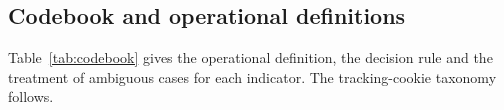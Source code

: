\documentclass[pdflatex,sn-basic,Numbered]{sn-jnl}
\theoremstyle{thmstyleone}
\theoremstyle{thmstyletwo}
\theoremstyle{thmstylethree}
\begin{document}
\begin{appendices}

\renewcommand{\thetable}{\thesection\arabic{table}}
\renewcommand{\thefigure}{\thesection\arabic{figure}}

\section{Codebook and operational definitions}\label{ap:codebook}
\setcounter{table}{0}\setcounter{figure}{0}

Table~\ref{tab:codebook} gives the operational definition, the decision rule and the treatment of ambiguous cases for each indicator. The tracking-cookie taxonomy follows.


\end{appendices}
\end{document}
